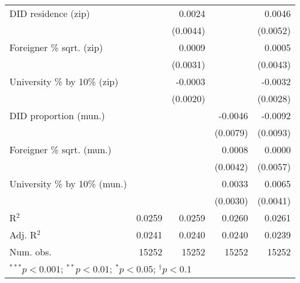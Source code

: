 \begin{tabular}{l D{.}{.}{5.11} D{.}{.}{5.11} D{.}{.}{5.11} D{.}{.}{5.11}}
DID residence (zip)               &                  & 0.0024           &                  & 0.0046           \\
                                  &                  & (0.0044)         &                  & (0.0052)         \\
Foreigner \% sqrt. (zip)          &                  & 0.0009           &                  & 0.0005           \\
                                  &                  & (0.0031)         &                  & (0.0043)         \\
University \% by 10\% (zip)       &                  & -0.0003          &                  & -0.0032          \\
                                  &                  & (0.0020)         &                  & (0.0028)         \\
DID proportion (mun.)             &                  &                  & -0.0046          & -0.0092          \\
                                  &                  &                  & (0.0079)         & (0.0093)         \\
Foreigner \% sqrt. (mun.)         &                  &                  & 0.0008           & 0.0000           \\
                                  &                  &                  & (0.0042)         & (0.0057)         \\
University \% by 10\% (mun.)      &                  &                  & 0.0033           & 0.0065           \\
                                  &                  &                  & (0.0030)         & (0.0041)         \\
\midrule
R$^2$                             & 0.0259           & 0.0259           & 0.0260           & 0.0261           \\
Adj. R$^2$                        & 0.0241           & 0.0240           & 0.0240           & 0.0239           \\
Num. obs.                         & 15252            & 15252            & 15252            & 15252            \\
\bottomrule
{}
\end{tabular}
